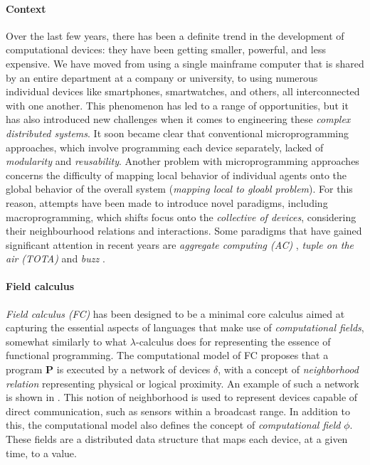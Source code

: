 \documentclass[12pt,a4paper,openright,twoside]{book}
\begin{document}
\paragraph{Context}
Over the last few years, there has been a definite trend in the development of computational devices: 
    they have been getting smaller, powerful, and less expensive. We have moved from using a 
    single mainframe computer that is shared by an entire department at a company or university, 
    to using numerous individual devices like smartphones, smartwatches, and others, all interconnected
    with one another. This phenomenon has led to a range of opportunities, but it has also introduced 
    new challenges when it comes to engineering these \emph{complex distributed systems}. It soon became clear 
    that conventional microprogramming approaches, which involve programming each device separately, lacked of 
    \emph{modularity} and \emph{reusability}. Another problem with microprogramming approaches concerns the 
    difficulty of mapping local behavior of individual agents onto the global behavior of the overall system
    (\emph{mapping local to gloabl problem}). 
    For this reason, attempts have been made to introduce novel paradigms, including 
    macroprogramming, which shifts focus onto the \emph{collective of devices}, considering their neighbourhood 
    relations and interactions.
    Some paradigms that have gained significant attention in recent years are \emph{aggregate computing (AC)} \cite{AC}, 
    \emph{tuple on the air (TOTA)} \cite{tota} and \emph{buzz} \cite{7498536}.

\paragraph{Field calculus}
\emph{Field calculus (FC)} \cite{viroli2016higher} has been designed to be a minimal core calculus aimed at capturing the essential 
    aspects of languages that make use of \emph{computational fields}, somewhat similarly to what $\lambda$-calculus does for 
    representing the essence of functional programming. 
    The computational model of FC proposes that a program \textbf{P} is executed by a network of devices $\delta$, with a concept 
    of \emph{neighborhood relation} representing physical or logical proximity. An example of such a network is shown in . 
    This notion of neighborhood is used to represent devices capable of direct communication, such as sensors within a broadcast range. 
    In addition to this, the computational model also defines the concept of \emph{computational field} $\phi$. 
    These fields \cite{VIROLI2019100486, 1316820} are 
    a distributed data structure that maps each device, at a given time, to a value.
\end{document}
